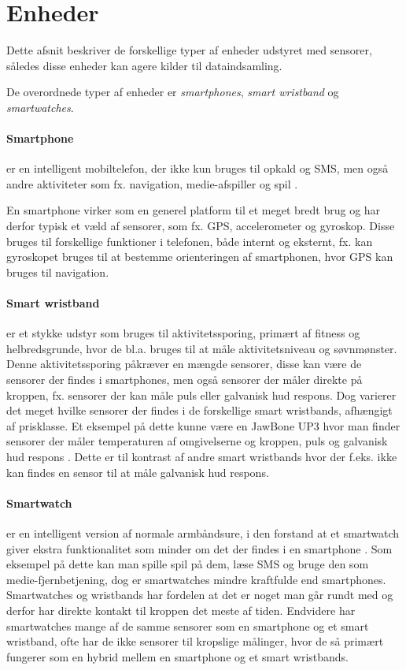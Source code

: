 \section{Enheder}\label{sec:kilder-til-sensorer}
Dette afsnit beskriver de forskellige typer af enheder udstyret med sensorer, således disse enheder kan agere kilder til dataindsamling.

De overordnede typer af enheder er \textit{smartphones}, \textit{smart wristband} og \textit{smartwatches}. 

\paragraph{Smartphone}
er en intelligent mobiltelefon, der ikke kun bruges til opkald og SMS, men også andre aktiviteter som fx. navigation, medie-afspiller og spil \citep{misc:smartphone}.

En smartphone virker som en generel platform til et meget bredt brug og har derfor typisk et væld af sensorer, som fx. GPS, accelerometer og gyroskop.
Disse bruges til forskellige funktioner i telefonen, både internt og eksternt, fx. kan gyroskopet bruges til at bestemme orienteringen af smartphonen, hvor GPS kan bruges til navigation.

\paragraph{Smart wristband} %
er et stykke udstyr som bruges til aktivitetssporing, primært af fitness og helbredsgrunde, hvor de bl.a. bruges til at måle aktivitetsniveau og søvnmønster.
Denne aktivitetssporing påkræver en mængde sensorer, disse kan være de sensorer der findes i smartphones, men også sensorer der måler direkte på kroppen, fx. sensorer der kan måle puls eller galvanisk hud respons. 
Dog varierer det meget hvilke sensorer der findes i de forskellige smart wristbands, afhængigt af prisklasse.
Et eksempel på dette kunne være en JawBone UP3 hvor man finder sensorer der måler temperaturen af omgivelserne og kroppen, puls og galvanisk hud respons \citep{misc:jawboneup3sensors}. 
Dette er til kontrast af andre smart wristbands hvor der f.eks. ikke kan findes en sensor til at måle galvanisk hud respons.

\paragraph{Smartwatch}
er en intelligent version af normale armbåndsure, i den forstand at et smartwatch giver ekstra funktionalitet som minder om det der findes i en smartphone \citep{msic:smartwatchstate}. 
Som eksempel på dette kan man spille spil på dem, læse SMS og bruge den som medie-fjernbetjening, dog er smartwatches mindre kraftfulde end smartphones. 
Smartwatches og wristbands har fordelen at det er noget man går rundt med og derfor har direkte kontakt til kroppen det meste af tiden.
Endvidere har smartwatches mange af de samme sensorer som en smartphone og et smart wristband, ofte har de ikke sensorer til kropslige målinger, hvor de så primært fungerer som en hybrid mellem en smartphone og et smart wristbands.

